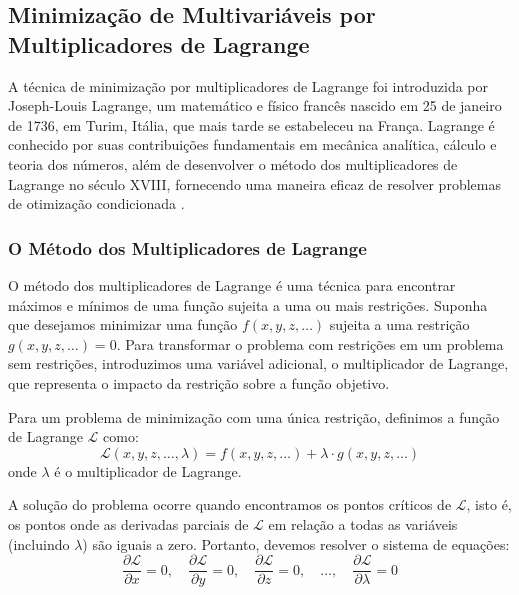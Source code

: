 \subsection{Minimização de Multivariáveis por Multiplicadores de Lagrange}

A técnica de minimização por multiplicadores de Lagrange foi introduzida por Joseph-Louis Lagrange, um matemático e físico francês nascido em 25 de janeiro de 1736, em Turim, Itália, que mais tarde se estabeleceu na França. Lagrange é conhecido por suas contribuições fundamentais em mecânica analítica, cálculo e teoria dos números, além de desenvolver o método dos multiplicadores de Lagrange no século XVIII, fornecendo uma maneira eficaz de resolver problemas de otimização condicionada \cite{lagrange}.

\subsubsection{O Método dos Multiplicadores de Lagrange}

O método dos multiplicadores de Lagrange é uma técnica para encontrar máximos e mínimos de uma função sujeita a uma ou mais restrições. Suponha que desejamos minimizar uma função $f(x, y, z, \dots)$ sujeita a uma restrição $g(x, y, z, \dots) = 0$. Para transformar o problema com restrições em um problema sem restrições, introduzimos uma variável adicional, o multiplicador de Lagrange, que representa o impacto da restrição sobre a função objetivo.

Para um problema de minimização com uma única restrição, definimos a função de Lagrange $\mathcal{L}$ como:
\begin{equation}
	\mathcal{L}(x, y, z, \dots, \lambda) = f(x, y, z, \dots) + \lambda \cdot g(x, y, z, \dots)
	\label{eq:lagrange_single_constraint}
\end{equation}
onde $\lambda$ é o multiplicador de Lagrange.

A solução do problema ocorre quando encontramos os pontos críticos de $\mathcal{L}$, isto é, os pontos onde as derivadas parciais de $\mathcal{L}$ em relação a todas as variáveis (incluindo $\lambda$) são iguais a zero. Portanto, devemos resolver o sistema de equações:
\begin{equation}
	\frac{\partial \mathcal{L}}{\partial x} = 0, \quad \frac{\partial \mathcal{L}}{\partial y} = 0, \quad \frac{\partial \mathcal{L}}{\partial z} = 0, \quad \dots, \quad \frac{\partial \mathcal{L}}{\partial \lambda} = 0
	\label{eq:lagrange_critical_points}
\end{equation}

